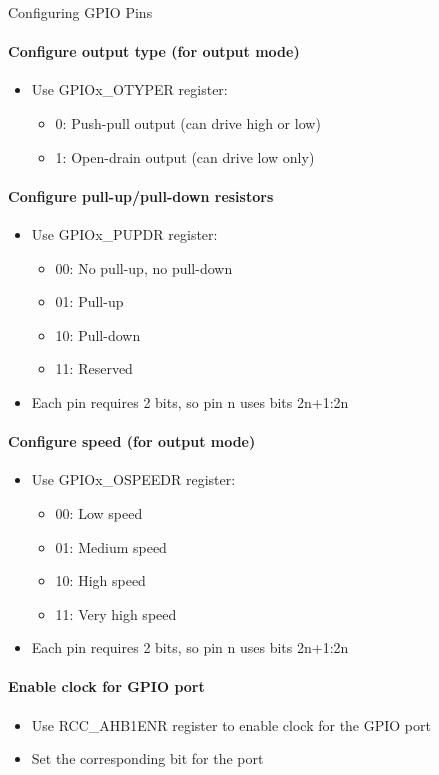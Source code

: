 \begin{KR}{Configuring GPIO Pins}
\paragraph{Configure output type (for output mode)}
\begin{itemize}
    \item Use GPIOx\_OTYPER register:
    \begin{itemize}
        \item 0: Push-pull output (can drive high or low)
        \item 1: Open-drain output (can drive low only)
    \end{itemize}
\end{itemize}

\paragraph{Configure pull-up/pull-down resistors}
\begin{itemize}
    \item Use GPIOx\_PUPDR register:
    \begin{itemize}
        \item 00: No pull-up, no pull-down
        \item 01: Pull-up
        \item 10: Pull-down
        \item 11: Reserved
    \end{itemize}
    \item Each pin requires 2 bits, so pin n uses bits 2n+1:2n
\end{itemize}

\paragraph{Configure speed (for output mode)}
\begin{itemize}
    \item Use GPIOx\_OSPEEDR register:
    \begin{itemize}
        \item 00: Low speed
        \item 01: Medium speed
        \item 10: High speed
        \item 11: Very high speed
    \end{itemize}
    \item Each pin requires 2 bits, so pin n uses bits 2n+1:2n
\end{itemize}

\paragraph{Enable clock for GPIO port}
\begin{itemize}
    \item Use RCC\_AHB1ENR register to enable clock for the GPIO port
    \item Set the corresponding bit for the port
\end{itemize}
\end{KR}


